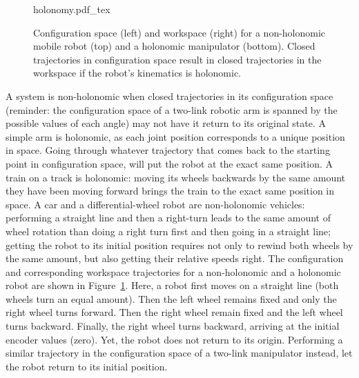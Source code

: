\begin{figure}[htb!]
    \small
    \centering
    \def\svgwidth{\textwidth}
    {holonomy.pdf_tex}
    \caption{Configuration space (left) and workspace (right) for a non-holonomic mobile robot (top) and a holonomic manipulator (bottom). Closed trajectories in configuration space result in closed trajectories in the workspace if the robot's kinematics is holonomic.}
    \label{fig:holonomy}
\end{figure}

A system is non-holonomic when closed trajectories in its configuration space (reminder: the configuration space of a two-link robotic arm is spanned by the possible values of each angle) may not have it return to its original state.  A simple arm is holonomic, as each joint position corresponds to a unique position in space. Going through whatever trajectory that comes back to the starting point in configuration space, will put the robot at the exact same position. A train on  a track is holonomic: moving its wheels backwards by the same amount they have been moving forward brings the train to the exact same position in space. A car and a differential-wheel robot are non-holonomic vehicles: performing a straight line and then a right-turn leads to the same amount of wheel rotation than doing a right turn first and then going in a straight line; getting the robot to its initial position requires not only to rewind both wheels by the same amount, but also getting their relative speeds right. The configuration and corresponding workspace trajectories for a non-holonomic and a holonomic robot are shown in Figure~\ref{fig:holonomy}. Here, a robot first moves on a straight line (both wheels turn an equal amount). Then the left wheel remains fixed and only the right wheel turns forward. Then the right wheel remain fixed and the left wheel turns backward. Finally, the right wheel turns backward, arriving at the initial encoder values (zero). Yet, the robot does not return to its origin. Performing a similar trajectory in the configuration space of a two-link manipulator instead, let the robot return to its initial position.

